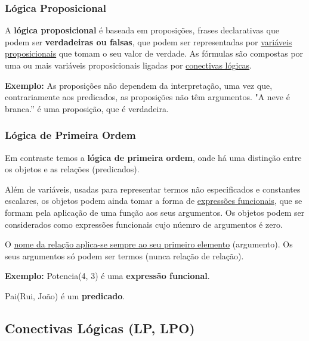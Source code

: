 \documentclass{article}
\begin{document}
\subsubsection{Lógica Proposicional}

A \textbf{lógica proposicional} é baseada em proposições, frases declarativas que podem ser
\textbf{verdadeiras ou falsas}, que podem ser representadas por \uline{variáveis proposicionais} que tomam o
seu valor de verdade. As fórmulas são compostas por uma ou mais variáveis proposicionais
ligadas por \uline{conectivas lógicas}.

\vspace{2mm}

\begin{flushleft}
  \textbf{Exemplo:} As proposições não dependem da interpretação, uma vez que, contrariamente aos predicados, as proposições não
  têm argumentos. "A neve é branca.” é uma proposição, que é verdadeira.
\end{flushleft}

\pagebreak

\subsubsection{Lógica de Primeira Ordem}

Em contraste temos a \textbf{lógica de primeira ordem}, onde há uma distinção entre os objetos e as
relações (predicados).

Além de variáveis, usadas para representar termos não especificados e constantes escalares,
os objetos podem ainda tomar a forma de \uline{expressões funcionais}, que se formam pela
aplicação de uma função aos seus argumentos. Os objetos podem ser considerados como
expressões funcionais cujo núemro de argumentos é zero.

O \uline{nome da relação aplica-se sempre ao seu primeiro elemento} (argumento). Os seus
argumentos só podem ser termos (nunca relação de relação).

\begin{flushleft}
  \textbf{Exemplo:} Potencia(4, 3) é uma \textbf{expressão funcional}.

  Pai(Rui, João) é um \textbf{predicado}. 
\end{flushleft}

\subsection{Conectivas Lógicas (LP, LPO)}
\end{document}
